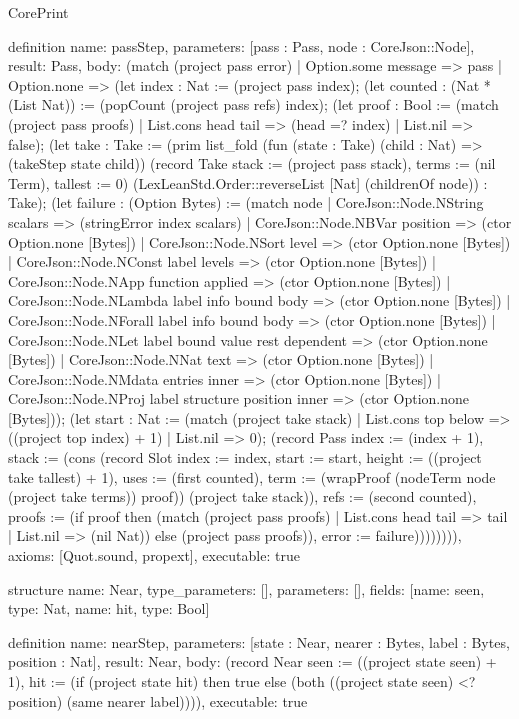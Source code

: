 \begin{lexlean}{CorePrint}
\begin{semanticmodule}
definition{
  name: passStep,
  parameters: [pass : Pass, node : CoreJson::Node],
  result: Pass,
  body: (match (project pass error)
    | Option.some message => pass
    | Option.none => (let index : Nat := (project pass index); (let counted : (Nat * (List Nat)) := (popCount (project pass refs) index); (let proof : Bool := (match (project pass proofs)
      | List.cons head tail => (head =? index)
      | List.nil => false); (let take : Take := (prim list_fold (fun (state : Take) (child : Nat) => (takeStep state child)) (record Take {stack := (project pass stack), terms := (nil Term), tallest := 0}) (LexLeanStd.Order::reverseList [Nat] (childrenOf node)) : Take); (let failure : (Option Bytes) := (match node
      | CoreJson::Node.NString scalars => (stringError index scalars)
      | CoreJson::Node.NBVar position => (ctor Option.none [Bytes])
      | CoreJson::Node.NSort level => (ctor Option.none [Bytes])
      | CoreJson::Node.NConst label levels => (ctor Option.none [Bytes])
      | CoreJson::Node.NApp function applied => (ctor Option.none [Bytes])
      | CoreJson::Node.NLambda label info bound body => (ctor Option.none [Bytes])
      | CoreJson::Node.NForall label info bound body => (ctor Option.none [Bytes])
      | CoreJson::Node.NLet label bound value rest dependent => (ctor Option.none [Bytes])
      | CoreJson::Node.NNat text => (ctor Option.none [Bytes])
      | CoreJson::Node.NMdata entries inner => (ctor Option.none [Bytes])
      | CoreJson::Node.NProj label structure position inner => (ctor Option.none [Bytes])); (let start : Nat := (match (project take stack)
      | List.cons top below => ((project top index) + 1)
      | List.nil => 0); (record Pass {index := (index + 1), stack := (cons (record Slot {index := index, start := start, height := ((project take tallest) + 1), uses := (first counted), term := (wrapProof (nodeTerm node (project take terms)) proof)}) (project take stack)), refs := (second counted), proofs := (if proof then (match (project pass proofs)
      | List.cons head tail => tail
      | List.nil => (nil Nat)) else (project pass proofs)), error := failure})))))))),
  axioms: [Quot.sound, propext],
  executable: true
}

structure{
  name: Near,
  type_parameters: [],
  parameters: [],
  fields: [{name: seen, type: Nat}, {name: hit, type: Bool}]
}

definition{
  name: nearStep,
  parameters: [state : Near, nearer : Bytes, label : Bytes, position : Nat],
  result: Near,
  body: (record Near {seen := ((project state seen) + 1), hit := (if (project state hit) then true else (both ((project state seen) <? position) (same nearer label)))}),
  executable: true
}


\end{semanticmodule}
\end{lexlean}
